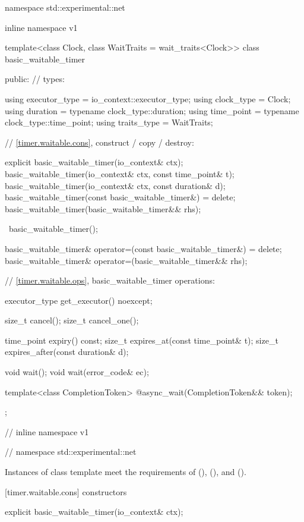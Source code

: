 %
\begin{codeblock}
namespace std::experimental::net {
inline namespace v1 {

  template<class Clock, class WaitTraits = wait_traits<Clock>>
  class basic_waitable_timer
  {
  public:
    // types:

    using executor_type = io_context::executor_type;
    using clock_type = Clock;
    using duration = typename clock_type::duration;
    using time_point = typename clock_type::time_point;
    using traits_type = WaitTraits;

    // \ref{timer.waitable.cons}, construct / copy / destroy:

    explicit basic_waitable_timer(io_context& ctx);
    basic_waitable_timer(io_context& ctx, const time_point& t);
    basic_waitable_timer(io_context& ctx, const duration& d);
    basic_waitable_timer(const basic_waitable_timer&) = delete;
    basic_waitable_timer(basic_waitable_timer&& rhs);

    ~basic_waitable_timer();

    basic_waitable_timer& operator=(const basic_waitable_timer&) = delete;
    basic_waitable_timer& operator=(basic_waitable_timer&& rhs);

    // \ref{timer.waitable.ops}, basic_waitable_timer operations:

    executor_type get_executor() noexcept;

    size_t cancel();
    size_t cancel_one();

    time_point expiry() const;
    size_t expires_at(const time_point& t);
    size_t expires_after(const duration& d);

    void wait();
    void wait(error_code& ec);

    template<class CompletionToken>
      @\DEDUCED@ async_wait(CompletionToken&& token);
  };

} // inline namespace v1
} // namespace std::experimental::net
\end{codeblock}

\pnum
Instances of class template  meet the requirements of  (),  (), and  ().


[timer.waitable.cons]{ constructors}

%
\begin{itemdecl}
explicit basic_waitable_timer(io_context& ctx);
\end{itemdecl}

